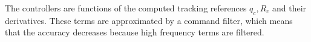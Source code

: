 The controllers are functions of the computed tracking references $ q_c, R_c $ and their derivatives. These terms are approximated by a command filter, which means that the accuracy decreases because high frequency terms are filtered.






